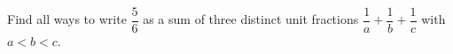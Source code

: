 Find all ways to write $\dfrac56$ as a sum of three distinct unit fractions $\dfrac1a+\dfrac1b+\dfrac1c$ with $a<b<c$.
